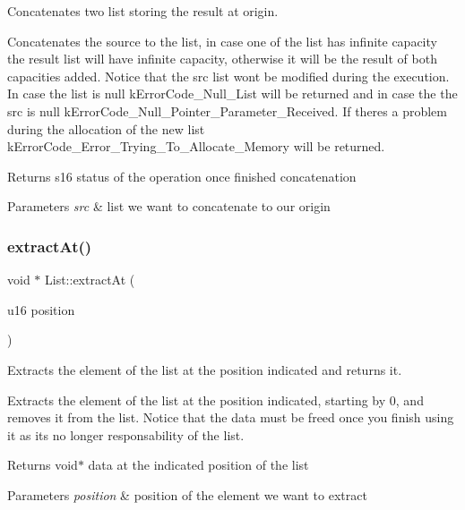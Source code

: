 Concatenates two list storing the result at origin. 

Concatenates the source to the list, in case one of the list has infinite capacity the result list will have infinite capacity, otherwise it will be the result of both capacities added. Notice that the src list won\textquotesingle{}t be modified during the execution. In case the list is null k\+Error\+Code\+\_\+\+Null\+\_\+\+List will be returned and in case the the src is null k\+Error\+Code\+\_\+\+Null\+\_\+\+Pointer\+\_\+\+Parameter\+\_\+\+Received. If there\textquotesingle{}s a problem during the allocation of the new list k\+Error\+Code\+\_\+\+Error\+\_\+\+Trying\+\_\+\+To\+\_\+\+Allocate\+\_\+\+Memory will be returned.

\begin{DoxyReturn}{Returns}
s16 status of the operation once finished concatenation 
\end{DoxyReturn}

\begin{DoxyParams}{Parameters}
{\em src} & list we want to concatenate to our origin \\
\hline
\end{DoxyParams}
\mbox{\label{class_list_a4c2d0d80bf25e79e8ed070798e0f23be}} 
\subsubsection{\texorpdfstring{extract\+At()}{extractAt()}}
{\footnotesize\ttfamily void $\ast$ List\+::extract\+At (\begin{DoxyParamCaption}\item[{u16}]{position }\end{DoxyParamCaption})}



Extracts the element of the list at the position indicated and returns it. 

Extracts the element of the list at the position indicated, starting by 0, and removes it from the list. Notice that the data must be freed once you finish using it as it\textquotesingle{}s no longer responsability of the list.

\begin{DoxyReturn}{Returns}
void$\ast$ data at the indicated position of the list 
\end{DoxyReturn}

\begin{DoxyParams}{Parameters}
{\em position} & position of the element we want to extract \\
\hline
\end{DoxyParams}
\mbox{\label{class_list_a6bd5b361c4a569a78fdeb5a78eacad03}} 
